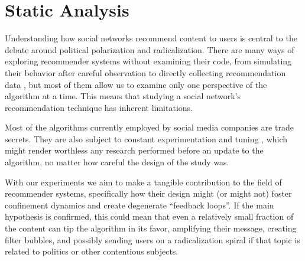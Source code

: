 





\chapter{Static Analysis}
\label{cap:static}

Understanding how social networks recommend content to users is central to the
debate around political polarization and radicalization. There are many ways of
exploring recommender systems without examining their code, from simulating
their behavior after careful observation \citep{yao_measuring_2021} to directly
collecting recommendation data \citep{ribeiro_auditing_2020}, but most of them
allow us to examine only one perspective of the algorithm at a time. This means
that studying a social network's recommendation technique has inherent
limitations.

Most of the algorithms currently employed by social media companies are trade
secrets. They are also subject to constant experimentation and tuning \citep{}, %
which might render worthless any research performed before an update to the
algorithm, no matter how careful the design of the study was.

With our experiments we aim to make a tangible contribution to the field of
recommender systems, specifically how their design might (or might not) foster
confinement dynamics and create degenerate ``feedback loops''. If the main
hypothesis is confirmed, this could mean that even a relatively small fraction
of the content can tip the algorithm in its favor, amplifying their message,
creating filter bubbles, and possibly sending users on a radicalization spiral
if that topic is related to politics or other contentious subjects.

